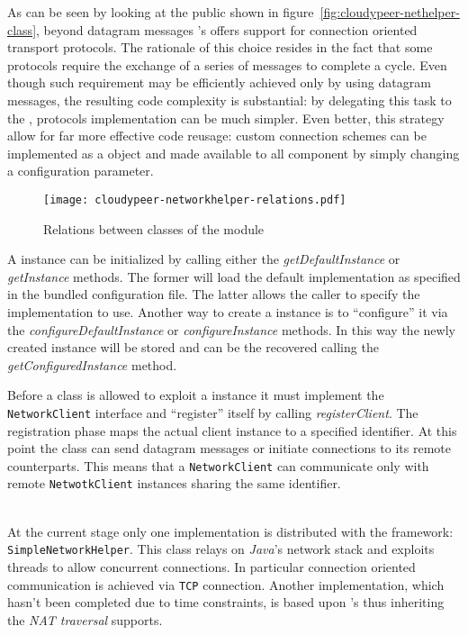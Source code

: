 As can be seen by looking at the public \api shown in
figure~\ref{fig:cloudypeer-nethelper-class}, beyond datagram messages
\cloudypeer's \networkhelper offers support for connection oriented
transport protocols. The rationale of this choice resides in the fact
that some \ptop protocols require the exchange of a series of messages
to complete a cycle. Even though such requirement may be efficiently
achieved only by using datagram messages, the resulting code complexity is
substantial: by delegating this task to the \networkhelper, protocols
implementation can be much simpler. Even better, this strategy allow
for far more effective code reusage: custom connection schemes can be
implemented as a \networkhelper object and made available to
all \cloudypeer component by simply changing a configuration parameter.

\begin{figure}[h!]
  \centering
  \texttt{[image: cloudypeer-networkhelper-relations.pdf]}
  \caption{Relations between classes of the \networkhelper module}
  \label{fig:cloudypeer-nethelper-relations}
\end{figure}

A \networkhelper instance can be initialized by calling either the
\textit{getDefaultInstance} or \textit{getInstance} methods. The former
will load the default implementation as specified in the bundled
configuration file. The latter allows the caller to specify the
implementation to use. Another way to create a \networkhelper instance
is to ``configure'' it via the \textit{configureDefaultInstance} or
\textit{configureInstance} methods. In this way the newly created
instance will be stored and can be the recovered calling the
\textit{getConfiguredInstance} method.

Before a class is allowed to exploit a \networkhelper instance it must
implement the \texttt{NetworkClient} interface and
``register'' itself by calling \textit{registerClient}. The
registration phase maps the actual client instance to a specified
identifier. At this point the class can send datagram messages or
initiate connections to its remote counterparts. This means that a
\texttt{NetworkClient} can communicate only with remote
\texttt{NetwotkClient} instances sharing the same identifier.

\ \\
At the current stage only one \networkhelper implementation is
distributed with the framework: \texttt{SimpleNetworkHelper}. This class
relays on \emph{Java}'s network stack and exploits threads to allow
concurrent connections. In particular connection oriented
communication is achieved via \texttt{TCP} connection.
Another implementation, which hasn't been completed due to time
constraints, is based upon \grapes's \networkhelper thus inheriting
the \emph{NAT  traversal} supports.

